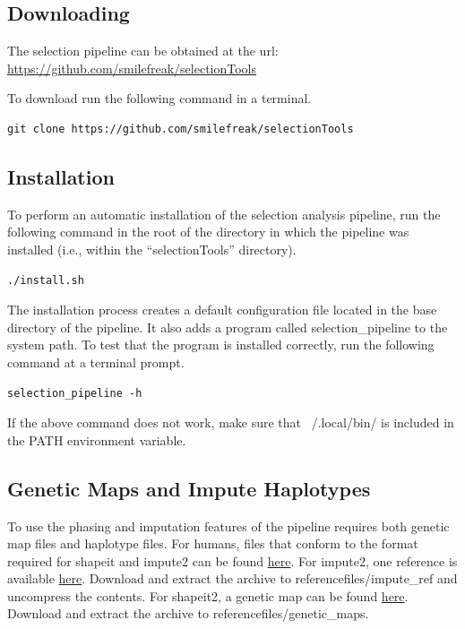 \documentclass[a4paper,10pt]{article}
\begin{document}
\subsection{Downloading}
The selection pipeline can be obtained at the url:
\href{https://github.com/smilefreak/selectionTools}
{https://github.com/smilefreak/selectionTools}

\noindent
To download run the following command in a terminal.

\begin{verbatim}
git clone https://github.com/smilefreak/selectionTools
\end{verbatim}

\subsection{Installation}

\noindent
To perform an automatic installation of the selection
analysis pipeline, run the following command in the root of the
directory in which the pipeline was installed (i.e., within the
``selectionTools'' directory).\\
\begin{verbatim}
./install.sh
\end{verbatim}

\noindent
The installation process creates a default configuration file located in the base
directory of the pipeline. It also adds a program called
selection\_pipeline to the system path. To test that the program is
installed correctly, run the following command at a terminal prompt.

\begin{verbatim}
selection_pipeline -h
\end{verbatim}

\noindent
If the above command does not work, make sure that ~/.local/bin/ is included in the PATH environment variable.

\subsection{Genetic Maps and Impute Haplotypes}
To use the phasing and imputation features of the pipeline requires
both genetic map files and haplotype files. For humans, files
that conform to the format required for shapeit and impute2 can be
found
\href{http://mathgen.stats.ox.ac.uk/impute/impute_v2.html#reference}{here}. For
impute2, one reference is available
\href{http://mathgen.stats.ox.ac.uk/impute/ALL_1000G_phase1integrated_v3_impute_macGT1.tgz}{here}.
Download and extract the archive to referencefiles/impute\_ref and
uncompress the contents. For shapeit2, a genetic map can be found
\href{http://www.shapeit.fr/files/genetic_map_b37.tar.gz}{here}.
Download and extract the archive to referencefiles/genetic\_maps. \\
\end{document}
